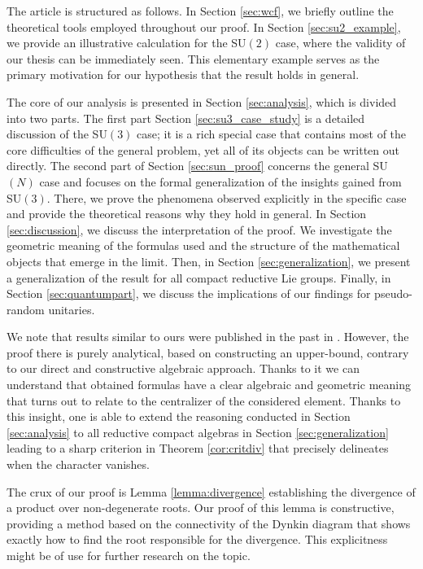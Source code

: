 \documentclass[11pt, a4paper]{article}
\theoremstyle{definition}
\theoremstyle{remark}
\begin{document}
The article is structured as follows. In Section \ref{sec:wcf}, we briefly outline the theoretical tools employed throughout our proof. In Section \ref{sec:su2_example}, we provide an illustrative calculation for the SU$(2)$ case, where the validity of our thesis can be immediately seen. This elementary example serves as the primary motivation for our hypothesis that the result holds in general.

The core of our analysis is presented in Section \ref{sec:analysis}, which is divided into two parts. The first part Section \ref{sec:su3_case_study} is a detailed discussion of the SU$(3)$ case; it is a rich special case that contains most of the core difficulties of the general problem, yet all of its objects can be written out directly. The second part of Section \ref{sec:sun_proof} concerns the general SU$(N)$ case and focuses on the formal generalization of the insights gained from SU$(3)$. There, we prove the phenomena observed explicitly in the specific case and provide the theoretical reasons why they hold in general. In Section \ref{sec:discussion}, we discuss the interpretation of the proof. We investigate the geometric meaning of the formulas used and the structure of the mathematical objects that emerge in the limit. Then, in Section \ref{sec:generalization}, we present a generalization of the result for all compact reductive Lie groups. Finally, in Section \ref{sec:quantumpart}, we discuss the implications of our findings for pseudo-random unitaries.



We note that results similar to ours were published in the past in \cite{SizeCharactersCompact1991}. However, the proof there is purely analytical, based on constructing an upper-bound, contrary to our direct and constructive algebraic approach. Thanks to it we can understand that obtained formulas have a clear algebraic and geometric meaning that turns out to relate to the centralizer of the considered element. Thanks to this insight, one is able to extend the reasoning conducted in Section \ref{sec:analysis} to all reductive compact algebras in Section \ref{sec:generalization} leading to a sharp criterion in Theorem \ref{cor:critdiv} that precisely delineates when the character vanishes. 

The crux of our proof is Lemma \ref{lemma:divergence} establishing the divergence of a product over non-degenerate roots. Our proof of this lemma is constructive, providing a method based on the connectivity of the Dynkin diagram that shows exactly how to find the root responsible for the divergence. This explicitness might be of use for further research on the topic.
\end{document}
